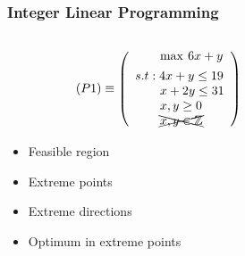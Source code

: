 \documentclass{beamer}
\begin{document}
    
    \begin{frame}
        \frametitle{Integer Linear Programming}
        
        \begin{columns}[T] %
        \begin{column}{.48\textwidth}
        \begin{equation*}
            (P1) \equiv 	\left( \begin{array}{l}
	                        \qquad \max \hspace{2pt}  6x + y  \vspace{4pt} \\ 
	                        s.t: 4x + y \leq 19 \\
	                        \qquad x + 2y \leq 31 \\
	                        \qquad x,y\geq 0 \\
	                        \qquad \xcancel{x,y \in \mathbb{Z}}
	                        \end{array} \right)
        \end{equation*}
        \begin{itemize}
            \item Feasible region
            \item Extreme points
            \item Extreme directions
            \item Optimum in extreme points
        \end{itemize}
        \end{column}%
        \hfill%
        \begin{column}{.48\textwidth}

\end{column}
\end{columns}
\end{frame}
\end{document}
